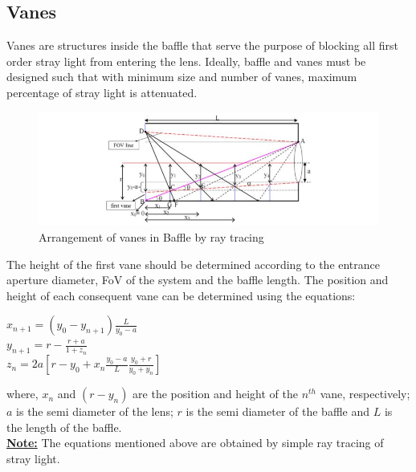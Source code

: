 \subsection{Vanes}
Vanes are structures inside the baffle that serve the purpose of blocking all first order stray light from entering the lens. Ideally, baffle and vanes must be designed such that with minimum size and number of vanes, maximum percentage of stray light is attenuated.
\par
\begin{figure}[h]
    \centering
    \includegraphics[width=\textwidth]{Figures/Instrumentation/vane_arrangement.JPG}
    \caption{Arrangement of vanes in Baffle by ray tracing}
    \label{fig:my_label}
\end{figure}
The height of the first vane should be determined according to the entrance  aperture diameter, FoV of the system and the baffle length. The position and height of each consequent vane can be determined using the equations:
\begin{center}
    $x_{n+1}=(y_{0}-y_{n+1})\frac{L}{y_{0}-a}$\\
    \vspace{2em}
    $y_{n+1}=r-\frac{r+a}{1+z_{n}} $\\
    \vspace{2em}
    $z_{n}=2a[r-y_{0}+x_{n}\frac{y_{0}-a}{L}\frac{y_{0}+r}{y_{0}+y_{n}}]$
\end{center}
\par
where, $x_{n}$ and $(r-y_{n})$ are the position and height of the $n^{th}$ vane, respectively; $a$ is the semi diameter of the lens; $r$ is the semi diameter of the baffle and $L$ is the length of the baffle.\\

\textbf{\underline{Note:}} The equations mentioned above are obtained by simple ray tracing of stray light.


